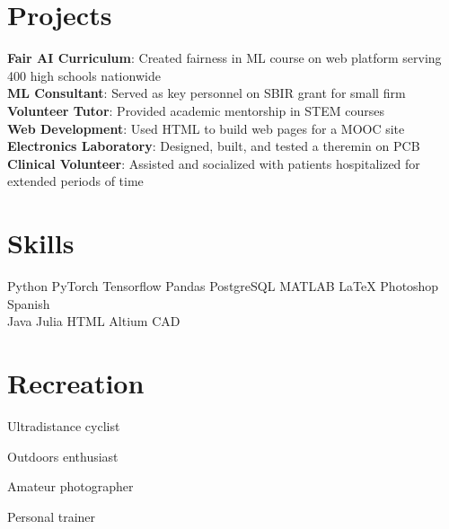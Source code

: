 \documentclass[]{deedy-resume-openfont}
\begin{document}
\begin{minipage}[t]{0.3\textwidth}
\section{Projects}
\textbf{Fair AI Curriculum}: Created fairness in ML course on web platform serving 400 high schools nationwide \\
\textbf{ML Consultant}: Served as key personnel on SBIR grant for small firm \\ %
\textbf{Volunteer Tutor}: Provided academic mentorship in STEM courses \\
\textbf{Web Development}: Used HTML to build web pages for a MOOC site \\
\textbf{Electronics Laboratory}: Designed, built, and tested a theremin on PCB \\
\textbf{Clinical Volunteer}: Assisted and socialized with patients hospitalized for extended periods of time
\sectionsep


\section{Skills}
Python \textbullet{} PyTorch \textbullet{} Tensorflow \textbullet{} Pandas \textbullet{} PostgreSQL   \textbullet{} MATLAB
\textbullet{} \LaTeX \textbullet{} Photoshop \textbullet{} Spanish \\
Java \textbullet{} Julia \textbullet{} HTML \textbullet{} Altium \textbullet{} CAD
\sectionsep

\section{Recreation}
\vspace{\topsep} %
\begin{tightemize}
\item Ultradistance cyclist \\
\item Outdoors enthusiast \\
\item Amateur photographer \\
\item Personal trainer
\end{tightemize}
\sectionsep


%
%

\end{minipage} 
\end{document}
